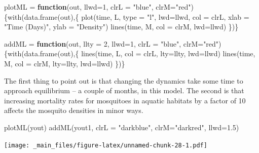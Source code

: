 \documentclass[
]{book}
\newenvironment{Shaded}{\begin{snugshade}}{\end{snugshade}}
\newcommand{\AttributeTok}[1]{\textcolor[rgb]{0.77,0.63,0.00}{#1}}
\newcommand{\ControlFlowTok}[1]{\textcolor[rgb]{0.13,0.29,0.53}{\textbf{#1}}}
\newcommand{\DecValTok}[1]{\textcolor[rgb]{0.00,0.00,0.81}{#1}}
\newcommand{\FloatTok}[1]{\textcolor[rgb]{0.00,0.00,0.81}{#1}}
\newcommand{\FunctionTok}[1]{\textcolor[rgb]{0.00,0.00,0.00}{#1}}
\newcommand{\NormalTok}[1]{#1}
\newcommand{\OtherTok}[1]{\textcolor[rgb]{0.56,0.35,0.01}{#1}}
\newcommand{\StringTok}[1]{\textcolor[rgb]{0.31,0.60,0.02}{#1}}
\begin{document}
\begin{Shaded}
\begin{Highlighting}[]
\NormalTok{plotML }\OtherTok{=} \ControlFlowTok{function}\NormalTok{(out, }\AttributeTok{llwd=}\DecValTok{1}\NormalTok{, }\AttributeTok{clrL =} \StringTok{"blue"}\NormalTok{, }\AttributeTok{clrM=}\StringTok{"red"}\NormalTok{)\{}\FunctionTok{with}\NormalTok{(}\FunctionTok{data.frame}\NormalTok{(out),\{}
  \FunctionTok{plot}\NormalTok{(time, L, }\AttributeTok{type =} \StringTok{"l"}\NormalTok{, }\AttributeTok{lwd=}\NormalTok{llwd, }\AttributeTok{col =}\NormalTok{ clrL, }\AttributeTok{xlab =} \StringTok{"Time (Days)"}\NormalTok{, }\AttributeTok{ylab =} \StringTok{"Density"}\NormalTok{) }
  \FunctionTok{lines}\NormalTok{(time, M, }\AttributeTok{col =}\NormalTok{ clrM, }\AttributeTok{lwd=}\NormalTok{llwd) }
\NormalTok{\})\}}

\NormalTok{addML }\OtherTok{=} \ControlFlowTok{function}\NormalTok{(out, }\AttributeTok{llty =} \DecValTok{2}\NormalTok{, }\AttributeTok{llwd=}\DecValTok{1}\NormalTok{, }\AttributeTok{clrL =} \StringTok{"blue"}\NormalTok{, }\AttributeTok{clrM=}\StringTok{"red"}\NormalTok{)\{}\FunctionTok{with}\NormalTok{(}\FunctionTok{data.frame}\NormalTok{(out),\{}
  \FunctionTok{lines}\NormalTok{(time, L, }\AttributeTok{col =}\NormalTok{ clrL, }\AttributeTok{lty=}\NormalTok{llty, }\AttributeTok{lwd=}\NormalTok{llwd) }
  \FunctionTok{lines}\NormalTok{(time, M, }\AttributeTok{col =}\NormalTok{ clrM, }\AttributeTok{lty=}\NormalTok{llty, }\AttributeTok{lwd=}\NormalTok{llwd) }
\NormalTok{\})\}}
\end{Highlighting}
\end{Shaded}

The first thing to point out is that changing the dynamics take some time to approach equilibrium -- a couple of months, in this model. The second is that increasing mortality rates for mosquitoes in aquatic habitats by a factor of 10 affects the mosquito densities in minor ways.

\begin{Shaded}
\begin{Highlighting}[]
\FunctionTok{plotML}\NormalTok{(yout)}
\FunctionTok{addML}\NormalTok{(yout1, }\AttributeTok{clrL =} \StringTok{"darkblue"}\NormalTok{, }\AttributeTok{clrM=}\StringTok{"darkred"}\NormalTok{, }\AttributeTok{llwd=}\FloatTok{1.5}\NormalTok{)}
\end{Highlighting}
\end{Shaded}

\texttt{[image: \_main\_files/figure-latex/unnamed-chunk-28-1.pdf]}
\end{document}
